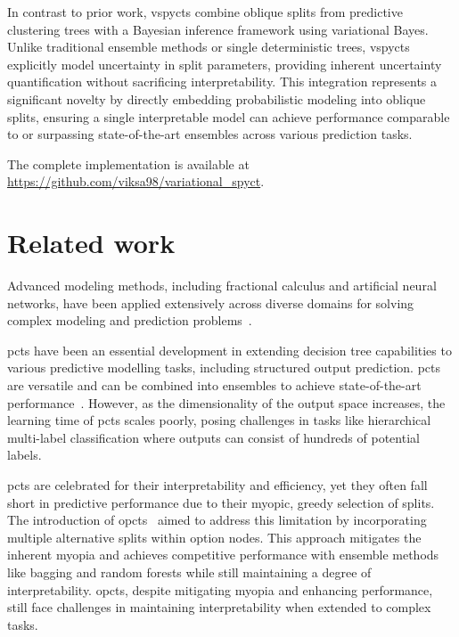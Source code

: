 \documentclass[3p,review,authoryear]{elsarticle}
\begin{document}
In contrast to prior work, \glspl{vspyct} combine oblique splits from predictive clustering trees with a Bayesian inference framework using variational Bayes.
Unlike traditional ensemble methods or single deterministic trees, \glspl{vspyct} explicitly model uncertainty in split parameters, providing inherent uncertainty quantification without sacrificing interpretability.
This integration represents a significant novelty by directly embedding probabilistic modeling into oblique splits, ensuring a single interpretable model can achieve performance comparable to or surpassing state-of-the-art ensembles across various prediction tasks.





The complete implementation is available at \url{https://github.com/viksa98/variational_spyct}.

\section{Related work}

Advanced modeling methods, including fractional calculus and artificial neural networks, have been applied extensively across diverse domains for solving complex modeling and prediction problems~\cite{Abbas_2024,Abbas_2025,Ramzan_2025,Abbas_2025_2, Andonovikj_2022}.

\Glspl{pct} have been an essential development in extending decision tree capabilities to various predictive modelling tasks, including structured output prediction.
\Glspl{pct} are versatile and can be combined into ensembles to achieve state-of-the-art performance~\citep{Kocev_2013}.
However, as the dimensionality of the output space increases, the learning time of \glspl{pct} scales poorly, posing challenges in tasks like hierarchical multi-label classification where outputs can consist of hundreds of potential labels.


\Glspl{pct} are celebrated for their interpretability and efficiency, yet they often fall short in predictive performance due to their myopic, greedy selection of splits.
The introduction of \glspl{opct}~\citep{Stepisnik_2020} aimed to address this limitation by incorporating multiple alternative splits within option nodes.
This approach mitigates the inherent myopia and achieves competitive performance with ensemble methods like bagging and random forests while still maintaining a degree of interpretability.
\Glspl{opct}, despite mitigating myopia and enhancing performance, still face challenges in maintaining interpretability when extended to complex tasks.
\end{document}
